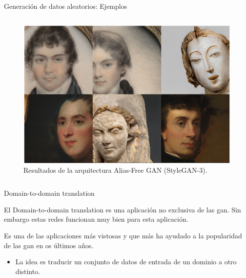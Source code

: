 \begin{frame}{Generación de datos aleatorios: Ejemplos}
\begin{columns}[T]
\begin{column}{.48\textwidth}
    \begin{figure}
        \centering
        \includegraphics[width=\textwidth]{Slides/figures/GAN/Alias-FreeGAN.PNG}
        \caption{Resultados de la arquitectura Alias-Free GAN (StyleGAN-3)\cite{karras2021alias}.}
    \end{figure}

    \end{column}
    \end{columns}

\end{frame}

\begin{frame}{Domain-to-domain translation}

    El \alert{Domain-to-domain translation} es una aplicación \alert{no exclusiva} de las \gls{gan}. Sin embargo estas redes funcionan muy bien para esta aplicación.
    
    Es una de las aplicaciones \alert{más vistosas} y que más ha ayudado a la popularidad de las \gls{gan} en os últimos años.
    
    \begin{itemize}
        \item La idea es traducir un conjunto de datos de entrada de \alert{un dominio a otro distinto}.
    \end{itemize}

\end{frame}

